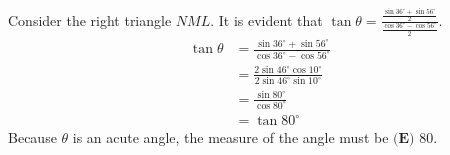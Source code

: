 \documentclass{article}
\begin{document}
Consider the right triangle $NML$. It is evident that $\tan\theta = \frac{\frac{\sin36^\circ + \sin56^\circ}{2}}{\frac{\cos36^\circ - \cos56^\circ}{2}}$.
\begin{align*}
    \tan\theta
    &= \frac{\sin36^\circ + \sin56^\circ}{\cos36^\circ - \cos56^\circ} \\[0.5em]
    &= \frac{2 \sin46^\circ \cos10^\circ}{2 \sin46^\circ \sin10^\circ} \\[0.5em]
    &= \frac{\sin80^\circ}{\cos80^\circ} \\[0.5em]
    &= \tan80^\circ
\end{align*}
Because $\theta$ is an acute angle, the measure of the angle must be $\boxed{\textbf{(E) } 80}$.
\end{document}
